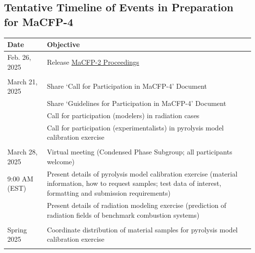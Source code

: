 \documentclass[12pt]{article}
\begin{document}
\subsection{Tentative Timeline of Events in Preparation for MaCFP-4}
\label{Timeline}
\begin{table}[h!]
\small
\begin{tabular}{p{0.16\linewidth} |p{0.84\linewidth}}
\hline
\textbf{Date}       & \textbf{Objective} \\
\hline
Feb. 26, 2025 		& Release \href{https://github.com/user-attachments/files/18370197/MaCFP-2_Proceedings_GasPhase.pdf}{MaCFP-2 Proceedings}\\
\\
March 21, 2025  	& Share `Call for Participation in MaCFP-4' Document\\
    & Share `Guidelines for Participation in MaCFP-4' Document \\
    & Call for participation (modelers) in radiation cases\\
    & Call for participation (experimentalists) in pyrolysis model calibration exercise\\
\\
March 28, 2025         & Virtual meeting (Condensed Phase Subgroup; all participants welcome)\\
9:00 AM (EST)   	& Present details of pyrolysis model calibration exercise (material information, how to request samples; test data of interest, formatting and submission requirements)\\
& Present details of radiation modeling exercise (prediction of radiation fields of benchmark combustion systems)\\
\\
Spring 2025  	& Coordinate distribution of material samples for pyrolysis model calibration exercise\\
\\


\end{tabular}
\end{table}
\end{document}
